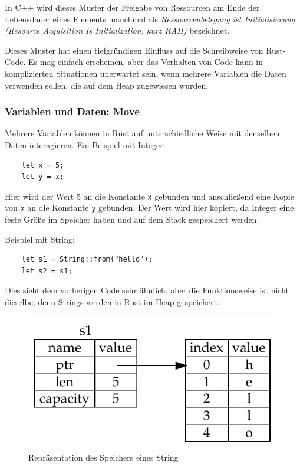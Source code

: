 In C++ wird dieses Muster der Freigabe von Ressourcen am Ende der Lebensdauer eines Elements manchmal als \textit{Ressourcenbelegung ist Initialisierung (Resource Acquisition Is Initialization, kurz RAII)} bezeichnet. \cite[p.~71]{CppProg}

Dieses Muster hat einen tiefgründigen Einfluss auf die Schreibweise von Rust-Code. Es mag einfach erscheinen, aber das Verhalten von Code kann in komplizierten Situationen unerwartet sein, wenn mehrere Variablen die Daten verwenden sollen, die auf dem Heap zugewiesen wurden.

\subsubsection{Variablen und Daten: Move}

Mehrere Variablen können in Rust auf unterschiedliche Weise mit denselben Daten interagieren. Ein Beispiel mit Integer:

\begin{lstlisting}
    let x = 5;
    let y = x;
\end{lstlisting}

Hier wird der Wert 5 an die Konstante \verb"x" gebunden und anschließend eine Kopie von \verb"x" an die Konstante \verb"y" gebunden. Der Wert wird hier kopiert, da Integer eine feste Größe im Speicher haben und auf dem Stack gespeichert werden.

Beispiel mit String:

\begin{lstlisting}
    let s1 = String::from("hello");
    let s2 = s1;
\end{lstlisting}

Dies sieht dem vorherigen Code sehr ähnlich, aber die Funktionsweise ist nicht dieselbe, denn Strings werden in Rust im Heap gespeichert.

\begin{figure}[htbp]
    \centering
    \includegraphics[scale=0.9]{Programmierung/Tabelle1.pdf}
    \caption{Repräsentation des Speichers eines String}
    \label{fig:tabelle1}
\end{figure}

